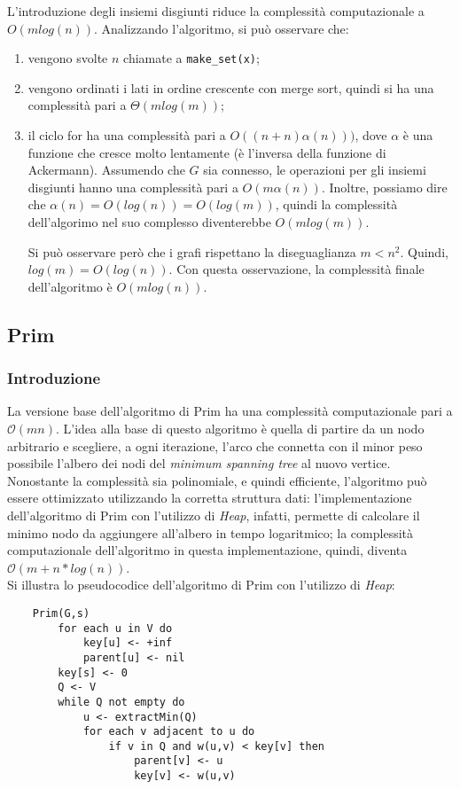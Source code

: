 L'introduzione degli insiemi disgiunti riduce la complessità computazionale
a $O(mlog(n))$. Analizzando l'algoritmo, si può osservare che:
\begin{enumerate}
    \item vengono svolte $n$ chiamate a \verb|make_set(x)|;
    \item vengono ordinati i lati in ordine crescente con merge sort,
    quindi si ha una complessità pari a $\Theta(mlog(m))$;
    \item il ciclo for ha una complessità pari a $O((n + n)\alpha(n)))$,
    dove $\alpha$ è una funzione che cresce molto lentamente (è l'inversa
    della funzione di Ackermann). Assumendo che $G$ sia connesso, le
    operazioni per gli insiemi disgiunti hanno una complessità pari a
    $O(m\alpha(n))$. Inoltre, possiamo dire che
    $\alpha(n) = O(log(n)) = O(log(m))$, quindi la complessità dell'algorimo
    nel suo complesso diventerebbe $O(m log(m))$.

    Si può osservare però che i grafi rispettano la diseguaglianza $m < n^2$.
    Quindi, $log(m) = O(log(n))$. Con questa osservazione, la complessità
    finale dell'algoritmo è $O(mlog(n))$.
\end{enumerate}

\subsection{Prim}

\subsubsection{Introduzione}

La versione base dell'algoritmo di Prim ha una complessità computazionale
pari a $\mathcal{O}(mn)$. L'idea alla base di questo algoritmo è quella di partire da un
nodo arbitrario e scegliere, a ogni iterazione, l'arco che connetta con il minor peso possibile
l'albero dei nodi del \textit{minimum spanning tree} al nuovo vertice. \\
Nonostante la complessità sia polinomiale, e quindi efficiente, l'algoritmo può essere ottimizzato
utilizzando la corretta struttura dati: l'implementazione dell'algoritmo di Prim con l'utilizzo di
\textit{Heap}, infatti, permette di calcolare il minimo nodo da aggiungere all'albero in tempo logaritmico;
la complessità computazionale dell'algoritmo in questa implementazione, quindi, diventa \newline $\mathcal{O}(m+n*log(n))$. \\
Si illustra lo pseudocodice dell'algoritmo di Prim con l'utilizzo di \textit{Heap}:
\newpage
\begin{verbatim}
    Prim(G,s)
        for each u in V do
            key[u] <- +inf
            parent[u] <- nil
        key[s] <- 0
        Q <- V
        while Q not empty do
            u <- extractMin(Q)
            for each v adjacent to u do
                if v in Q and w(u,v) < key[v] then
                    parent[v] <- u
                    key[v] <- w(u,v)
\end{verbatim}

